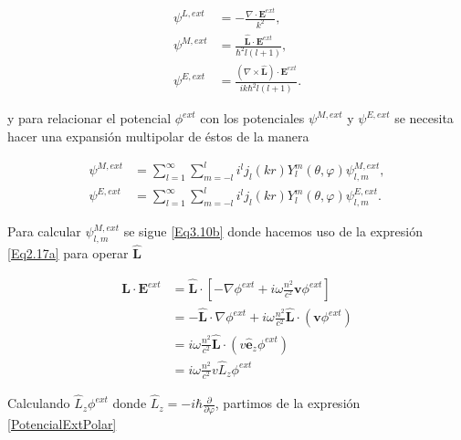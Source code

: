 \documentclass[a4paper,10pt]{article}
\newcommand{\hatbf}[1] {\hat{\mathbf{#1}}}	%
\begin{document}
\begin{subequations}
\begin{align}
\psi^{L,ext}	&=-\frac{\nabla\cdot\textbf{E}^{ext}}{k^2},	\label{Eq3.10a}	\\
\psi^{M,ext}	&=\frac{\hatbf{L}\cdot\textbf{E}^{ext}}{\hbar^2l(l+1)},	\label{Eq3.10b}	\\
\psi^{E,ext}	&=\frac{(\nabla\times\hatbf{L})\cdot\textbf{E}^{ext}}{ik\hbar^2l(l+1)}.	\label{Eq3.10c}
\end{align}
\label{Eq3.9}
\end{subequations}

y para relacionar el potencial $\phi^{ext}$ con los potenciales $\psi^{M,ext}$ y $\psi^{E,ext}$ se necesita hacer una expansión multipolar de éstos de la manera

\begin{subequations}
\begin{align}
\psi^{M,ext}	&=\sum_{l=1}^{\infty}\sum_{m=-l}^{l}i^l j_l(kr)Y_l^m(\theta,\varphi)\psi_{l,m}^{M,ext},	\label{Eq3.11a}	\\
\psi^{E,ext}	&=\sum_{l=1}^{\infty}\sum_{m=-l}^{l}i^l j_l(kr)Y_l^m(\theta,\varphi)\psi_{l,m}^{E,ext}.	\label{Eq3.11b}
\end{align}
\end{subequations}

Para calcular $\psi_{l,m}^{M,ext}$ se sigue \eqref{Eq3.10b} donde hacemos uso de la expresión \eqref{Eq2.17a} para operar $\hatbf{L}$

\begin{subequations}
\begin{align}
\hatbf{L}\cdot\textbf{E}^{ext}
&=\hatbf{L}\cdot\left[-\nabla\phi^{ext}+i\omega\frac{n^2}{c^2}\textbf{v}\phi^{ext}\right]	\\
&=-\hatbf{L}\cdot\nabla\phi^{ext}+i\omega\frac{n^2}{c^2}\hatbf{L}\cdot(\textbf{v}\phi^{ext})	\\
&=i\omega\frac{n^2}{c^2}\hatbf{L}\cdot(v\hatbf{e}_z\phi^{ext})	\\
&=i\omega\frac{n^2}{c^2}v\hat{L}_z\phi^{ext}
\end{align}
\end{subequations}

Calculando $\hat{L}_z\phi^{ext}$ donde $\hat{L}_z=-i\hbar\frac{\partial}{\partial\varphi}$, partimos de la expresión \eqref{PotencialExtPolar}
\end{document}
